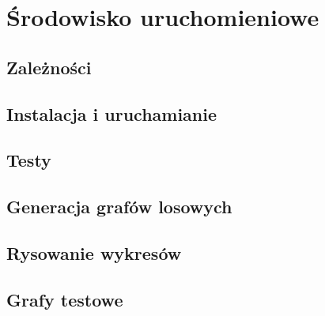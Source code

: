 \chapter{Środowisko uruchomieniowe}
\section{Zależności}
\section{Instalacja i uruchamianie}
\section{Testy}
\section{Generacja grafów losowych}
\section{Rysowanie wykresów}
\section{Grafy testowe}